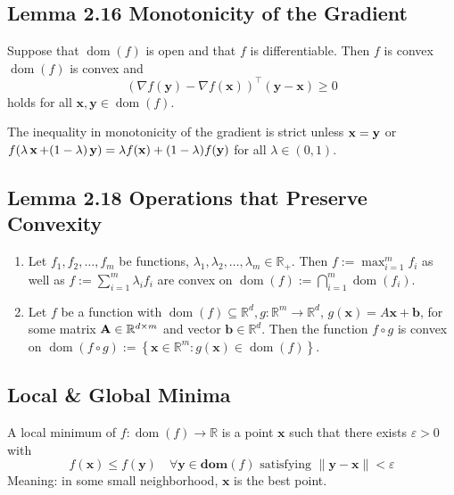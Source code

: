 \subsection*{Lemma 2.16 Monotonicity of the Gradient}
Suppose that $\operatorname{dom}(f)$ is open and that $f$ is differentiable. Then $f$ is convex  $\operatorname{dom}(f)$ is convex and
$$
(\nabla f(\mathbf{y})-\nabla f(\mathbf{x}))^{\top}(\mathbf{y}-\mathbf{x}) \geq 0
$$
holds for all $\mathbf{x}, \mathbf{y} \in \operatorname{dom}(f)$.

The inequality in monotonicity of the gradient is strict unless $\operatorname{\boldsymbol{\mathbf{x}}}=\operatorname{\boldsymbol{\mathbf{y}}}$ or $f(\lambda \operatorname{\boldsymbol{\mathbf{x}}}+(1-\lambda) \operatorname{\boldsymbol{\mathbf{y}}})=\lambda f(\operatorname{\boldsymbol{\mathbf{x}}})+(1-\lambda) f(\operatorname{\boldsymbol{\mathbf{y}}})$ for all $\lambda \in(0,1)$.


\subsection*{Lemma 2.18 Operations that Preserve Convexity}
\begin{enumerate}[label = (\arabic*), leftmargin=*]
    \item Let $f_{1}, f_{2}, \ldots, f_{m}$ be  functions, $\lambda_{1}, \lambda_{2}, \ldots, \lambda_{m} \in \mathbb{R}_{+}$. Then
$
f:=\max _{i=1}^{m} f_{i}
$
as well as
$
f:=\sum_{i=1}^{m} \lambda_{i} f_{i}
$
are convex on $\operatorname{dom}(f):=\bigcap_{i=1}^{m} \operatorname{dom}\left(f_{i}\right)$.
   
    \item Let $f$ be a  function with $\operatorname{dom}(f) \subseteq \mathbb{R}^{d}, g: \mathbb{R}^{m} \rightarrow \mathbb{R}^{d}$, $g(\mathbf{x})=A \mathbf{x}+\mathbf{b}$, for some matrix $\boldsymbol{\mathbf{A}} \in \mathbb{R}^{d \times m}$ and vector $\mathbf{b} \in \mathbb{R}^{d}$. Then the function $f \circ g$ is convex on $\operatorname{dom}(f \circ g):=\left\{\mathbf{x} \in \mathbb{R}^{m}: g(\mathbf{x}) \in \operatorname{dom}(f)\right\}$.
\end{enumerate}

\subsection*{Local \& Global Minima}
A local minimum of $f: \operatorname{dom}(f) \rightarrow \mathbb{R}$ is a point $\mathbf{x}$ such that there exists $\varepsilon>0$ with
$$
f(\mathbf{x}) \leq f(\mathbf{y}) \quad \forall \mathbf{y} \in \mathbf{d o m}(f) \text { satisfying }\|\mathbf{y}-\mathbf{x}\|<\varepsilon
$$
Meaning: in some small neighborhood, $\mathbf{x}$ is the best point.


